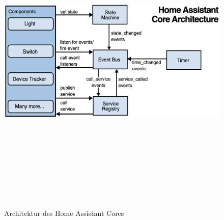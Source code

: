     \begin{figure}[hbt!]
        \centering
        \includegraphics[width=15cm,height=15cm,keepaspectratio]{images/HAOS_Core_Architecture.png}
        \caption{Architektur des Home Assistant Cores \cite{HAOSarchitecture2018}}
        \label{fig:architectureHAOSCore}
    \end{figure}
